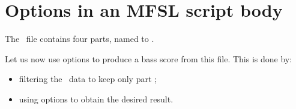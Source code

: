 \section{Options in an MFSL script body}

The \mxml\ file  contains four parts, named  to .

Let us now use options to produce a bass score from this file. This is done by:
\begin{itemize}
\item  filtering the \mxml\ data to keep only part ;
\item  using options to obtain the desired result.
\end{itemize}

